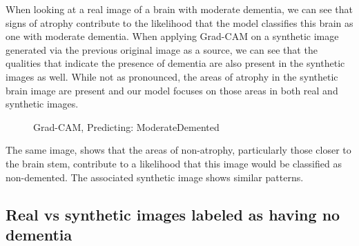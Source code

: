 \documentclass [MAS] {uclathes}
\begin{document}
When looking at a real image of a brain with moderate dementia, we can see that signs of atrophy contribute to the 
likelihood that the model classifies this brain as one with moderate dementia. When applying Grad-CAM on a synthetic 
image generated via the previous original image as a source, we can see that the qualities that indicate the presence of 
dementia are also present in the synthetic images as well. While not as pronounced, the areas of atrophy in the 
synthetic brain image are present and our model focuses on those areas in both real and synthetic images.

\begin{figure}[H]
    \centering
    \hspace{0.001\textwidth}
    \caption{Grad-CAM, Predicting: ModerateDemented}
\end{figure}
The same image, shows that the areas of non-atrophy, particularly those closer to the brain stem, contribute to a 
likelihood that this image would be classified as non-demented. The associated synthetic image shows similar patterns.



\subsection{Real vs synthetic images labeled as having no dementia}
\end{document}
